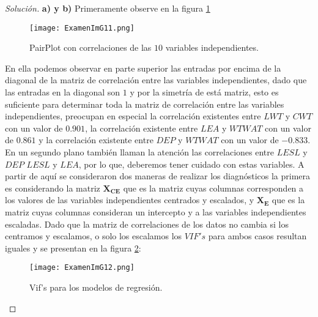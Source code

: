 \documentclass[10.5pt,notitlepage]{article}
\newenvironment{solucion}
  {\begin{proof}[Solución]}
  {\end{proof}}
\theoremstyle{plain}
\begin{document}
\begin{exo}

\end{exo}
\begin{solucion}
\textbf{a) y b)} Primeramente observe en la figura \ref{fig11}
\begin{figure}[htb]
 \centering
 \texttt{[image: ExamenImG11.png]}
 \caption{PairPlot con correlaciones de las \(10\) variables independientes.}
\label{fig11}
\end{figure}
En ella podemos observar en parte superior las entradas por encima de la diagonal de la matriz de correlación entre las variables independientes, dado que las entradas en la diagonal son \(1\) y por la simetría de está matriz, esto es suficiente para determinar toda la matriz de correlación entre las variables independientes, preocupan en especial la correlación existentes entre \(LWT\) y \(CWT\) con un valor de \(0.901\), la correlación existente entre \(LEA\) y \(WTWAT\) con un valor de \(0.861\) y la correlación existente entre \(DEP\) y \(WTWAT\) con un valor de \(-0.833\). En un segundo plano también llaman la atención las correlaciones entre \(LESL\) y \(DEP\) \(LESL\) y \(LEA\), por lo que, deberemos tener cuidado con estas variables. A partir de aquí se consideraron dos maneras de realizar los diagnósticos la primera es considerando la matriz \(\mathbf{X_{CE}}\) que es la matriz cuyas columnas corresponden a los valores de las variables independientes centrados y escalados, y \(\mathbf{X_{E}}\) que es la matriz cuyas columnas consideran un intercepto y a las variables independientes escaladas. Dado que la matriz de correlaciones de los datos no cambia si los centramos y escalamos, o solo los escalamos los \(VIF's\) para ambos casos resultan iguales y se presentan en la figura \ref{fig22}: 
\begin{figure}[htb]
 \centering
 \texttt{[image: ExamenImG12.png]}
 \caption{Vif's para los modelos de regresión.}
\label{fig22}
\end{figure}


\end{solucion}
\end{document}

